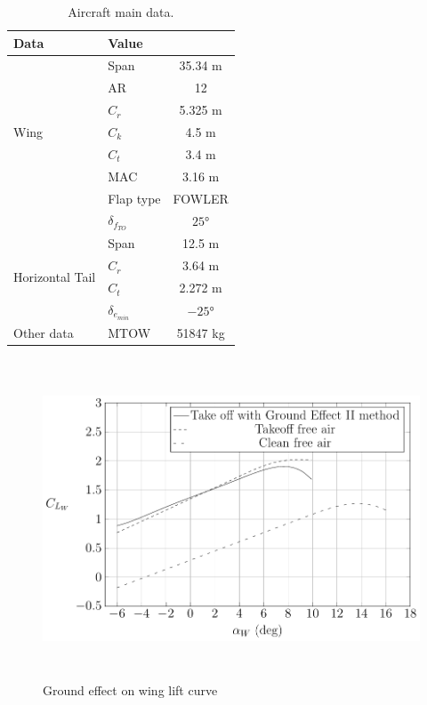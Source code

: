 \begin{table}[H]
\begin{centering}
\begin{tabular}{llc}
\toprule
\textbf{Data}&\textbf{Value} \\
\hline
\multirow{ 7}{*}{Wing}&Span	&	35.34 m	\\
& AR & 12 \\
& $C_r$ & 5.325 m \\
& $C_k$ & 4.5 m \\
& $C_t$ & 3.4 m \\
&  MAC & 3.16 m \\
& Flap type & FOWLER \\
& $\delta_{f_{TO}}$ & $\ang{25}$ \\
\hline
\multirow{4}{*}{Horizontal Tail }&Span	&	12.5 m	\\
& $C_r$ & 3.64 m \\
& $C_t$ & 2.272 m \\
& $\delta_{e_{min}}$ & $\ang{-25}$ \\
\hline
Other data&MTOW	&	51847 kg	\\
\bottomrule

\end{tabular}
\caption{Aircraft main data.}
\label{tabellaB.1}
\end{centering}
\end{table}


\begin{figure}[H]
	\includegraphics[height=9.5cm, keepaspectratio ]{Immagini/Capitolo3/3_1-GroundEffectOnWingLiftCurve} 
	\caption{Ground effect on wing lift curve} %
	\label{fig:figura3_1} %
\end{figure}

